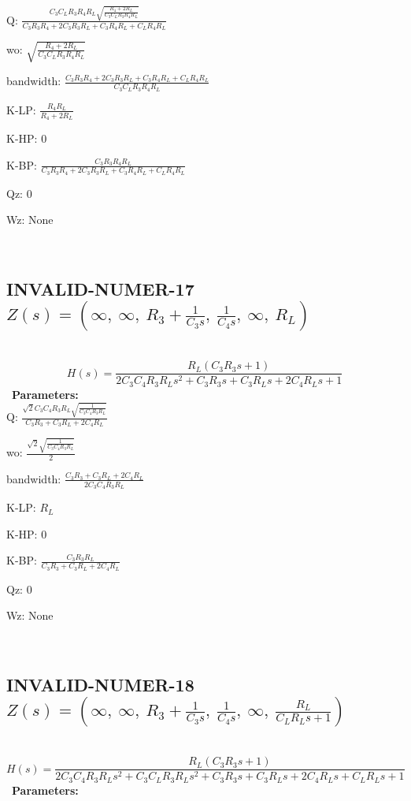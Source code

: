 \documentclass{article}
\begin{document}
Q: $\frac{C_{3} C_{L} R_{3} R_{4} R_{L} \sqrt{\frac{R_{4} + 2 R_{L}}{C_{3} C_{L} R_{3} R_{4} R_{L}}}}{C_{3} R_{3} R_{4} + 2 C_{3} R_{3} R_{L} + C_{3} R_{4} R_{L} + C_{L} R_{4} R_{L}}$\ 

wo: $\sqrt{\frac{R_{4} + 2 R_{L}}{C_{3} C_{L} R_{3} R_{4} R_{L}}}$\ 

bandwidth: $\frac{C_{3} R_{3} R_{4} + 2 C_{3} R_{3} R_{L} + C_{3} R_{4} R_{L} + C_{L} R_{4} R_{L}}{C_{3} C_{L} R_{3} R_{4} R_{L}}$\ 

K-LP: $\frac{R_{4} R_{L}}{R_{4} + 2 R_{L}}$\ 

K-HP: $0$\ 

K-BP: $\frac{C_{3} R_{3} R_{4} R_{L}}{C_{3} R_{3} R_{4} + 2 C_{3} R_{3} R_{L} + C_{3} R_{4} R_{L} + C_{L} R_{4} R_{L}}$\ 

Qz: $0$\ 

Wz: $\text{None}$\ 

\ 

\subsection{INVALID-NUMER-17 $Z(s) = \left( \infty, \  \infty, \  R_{3} + \frac{1}{C_{3} s}, \  \frac{1}{C_{4} s}, \  \infty, \  R_{L}\right)$ } \ 
\textbf{\[H(s) = \frac{R_{L} \left(C_{3} R_{3} s + 1\right)}{2 C_{3} C_{4} R_{3} R_{L} s^{2} + C_{3} R_{3} s + C_{3} R_{L} s + 2 C_{4} R_{L} s + 1}\] } \ 
\textbf{Parameters:}\\ 

Q: $\frac{\sqrt{2} C_{3} C_{4} R_{3} R_{L} \sqrt{\frac{1}{C_{3} C_{4} R_{3} R_{L}}}}{C_{3} R_{3} + C_{3} R_{L} + 2 C_{4} R_{L}}$\ 

wo: $\frac{\sqrt{2} \sqrt{\frac{1}{C_{3} C_{4} R_{3} R_{L}}}}{2}$\ 

bandwidth: $\frac{C_{3} R_{3} + C_{3} R_{L} + 2 C_{4} R_{L}}{2 C_{3} C_{4} R_{3} R_{L}}$\ 

K-LP: $R_{L}$\ 

K-HP: $0$\ 

K-BP: $\frac{C_{3} R_{3} R_{L}}{C_{3} R_{3} + C_{3} R_{L} + 2 C_{4} R_{L}}$\ 

Qz: $0$\ 

Wz: $\text{None}$\ 

\ 

\subsection{INVALID-NUMER-18 $Z(s) = \left( \infty, \  \infty, \  R_{3} + \frac{1}{C_{3} s}, \  \frac{1}{C_{4} s}, \  \infty, \  \frac{R_{L}}{C_{L} R_{L} s + 1}\right)$ } \ 
\textbf{\[H(s) = \frac{R_{L} \left(C_{3} R_{3} s + 1\right)}{2 C_{3} C_{4} R_{3} R_{L} s^{2} + C_{3} C_{L} R_{3} R_{L} s^{2} + C_{3} R_{3} s + C_{3} R_{L} s + 2 C_{4} R_{L} s + C_{L} R_{L} s + 1}\] } \ 
\textbf{Parameters:}\\ 
\end{document}
